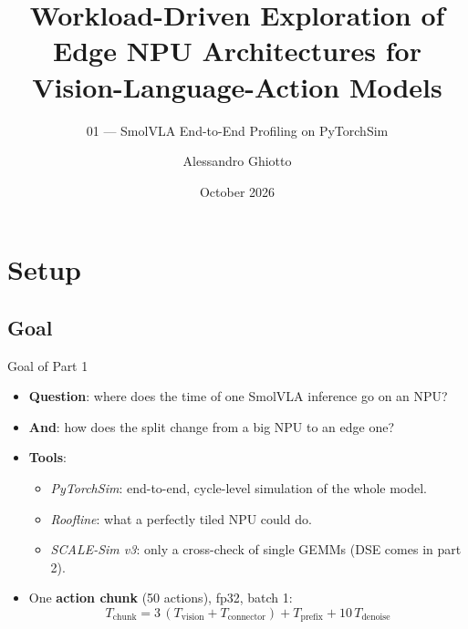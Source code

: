\documentclass[light]{theme-beamer}
\title[Edge NPU for VLAs]{Workload-Driven Exploration of Edge NPU Architectures for Vision-Language-Action Models}
\subtitle{01 --- SmolVLA End-to-End Profiling on PyTorchSim}
\author{Alessandro Ghiotto}
\institute{Politecnico di Milano --- MSc in High Performance Computing Engineering}
\date{October 2026}
\begin{document}
\begin{frame}[plain]
    \titlepage
\end{frame}

\section{Setup}
\subsection{Goal}
\begin{frame}{Goal of Part 1}
    \begin{itemize}
        \item \textbf{Question}: where does the time of one SmolVLA inference go on an NPU?
        \item \textbf{And}: how does the split change from a big NPU to an edge one?
        \vspace{0.8em}
        \item \textbf{Tools}:
        \begin{itemize}
            \item \textit{PyTorchSim}: end-to-end, cycle-level simulation of the whole model.
            \item \textit{Roofline}: what a perfectly tiled NPU could do.
            \item \textit{SCALE-Sim v3}: only a cross-check of single GEMMs (DSE comes in part 2).
        \end{itemize}
        \vspace{0.8em}
        \item One \textbf{action chunk} (50 actions), fp32, batch 1:
        \[
            T_\text{chunk} = 3\,(T_\text{vision} + T_\text{connector}) + T_\text{prefix} + 10\,T_\text{denoise}
        \]
    \end{itemize}
\end{frame}
\end{document}
